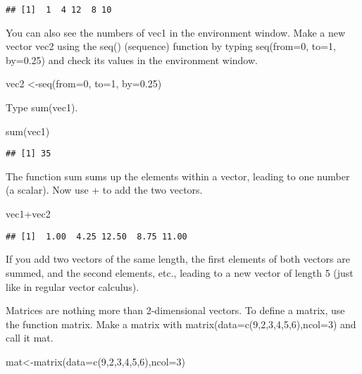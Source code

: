 \documentclass[
]{article}
\newenvironment{Shaded}{\begin{snugshade}}{\end{snugshade}}
\newcommand{\AttributeTok}[1]{\textcolor[rgb]{0.77,0.63,0.00}{#1}}
\newcommand{\DecValTok}[1]{\textcolor[rgb]{0.00,0.00,0.81}{#1}}
\newcommand{\FloatTok}[1]{\textcolor[rgb]{0.00,0.00,0.81}{#1}}
\newcommand{\FunctionTok}[1]{\textcolor[rgb]{0.00,0.00,0.00}{#1}}
\newcommand{\NormalTok}[1]{#1}
\newcommand{\OtherTok}[1]{\textcolor[rgb]{0.56,0.35,0.01}{#1}}
\newcommand{\SpecialCharTok}[1]{\textcolor[rgb]{0.00,0.00,0.00}{#1}}
\begin{document}
\begin{verbatim}
## [1]  1  4 12  8 10
\end{verbatim}

You can also see the numbers of vec1 in the environment window. Make a
new vector vec2 using the seq() (sequence) function by typing
seq(from=0, to=1, by=0.25) and check its values in the environment
window.

\begin{Shaded}
\begin{Highlighting}[]
\NormalTok{vec2 }\OtherTok{\textless{}{-}}\FunctionTok{seq}\NormalTok{(}\AttributeTok{from=}\DecValTok{0}\NormalTok{, }\AttributeTok{to=}\DecValTok{1}\NormalTok{, }\AttributeTok{by=}\FloatTok{0.25}\NormalTok{)}
\end{Highlighting}
\end{Shaded}

Type sum(vec1).

\begin{Shaded}
\begin{Highlighting}[]
\FunctionTok{sum}\NormalTok{(vec1)}
\end{Highlighting}
\end{Shaded}

\begin{verbatim}
## [1] 35
\end{verbatim}

The function sum sums up the elements within a vector, leading to one
number (a scalar). Now use + to add the two vectors.

\begin{Shaded}
\begin{Highlighting}[]
\NormalTok{vec1}\SpecialCharTok{+}\NormalTok{vec2}
\end{Highlighting}
\end{Shaded}

\begin{verbatim}
## [1]  1.00  4.25 12.50  8.75 11.00
\end{verbatim}

If you add two vectors of the same length, the first elements of both
vectors are summed, and the second elements, etc., leading to a new
vector of length 5 (just like in regular vector calculus).

Matrices are nothing more than 2-dimensional vectors. To define a
matrix, use the function matrix. Make a matrix with
matrix(data=c(9,2,3,4,5,6),ncol=3) and call it mat.

\begin{Shaded}
\begin{Highlighting}[]
\NormalTok{mat}\OtherTok{\textless{}{-}}\FunctionTok{matrix}\NormalTok{(}\AttributeTok{data=}\FunctionTok{c}\NormalTok{(}\DecValTok{9}\NormalTok{,}\DecValTok{2}\NormalTok{,}\DecValTok{3}\NormalTok{,}\DecValTok{4}\NormalTok{,}\DecValTok{5}\NormalTok{,}\DecValTok{6}\NormalTok{),}\AttributeTok{ncol=}\DecValTok{3}\NormalTok{)}
\end{Highlighting}
\end{Shaded}
\end{document}
